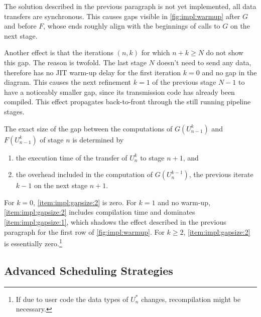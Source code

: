 The solution described in the previous paragraph is not yet implemented,
\ie all data transfers are synchronous.
This causes gaps visible in \autoref{fig:impl:warmup} after $G$ and before $F$,
whose ends roughly align with the beginnings of calls to $G$ on the next stage.

Another effect is that the iterations $(n,k)$ for which $n+k \geq N$ do not show this gap.
The reason is twofold.
The last stage $N$ doesn't need to send any data, therefore has no \ac{JIT} warm-up delay for the first iteration $k=0$ and no gap in the diagram.
This causes the next refinement $k=1$ of the previous stage $N-1$ to have a noticeably smaller gap,
since its transmission code has already been compiled.
This effect propagates back-to-front through the still running pipeline stages.

The exact size of the gap between the computations of $G(U_{n-1}^k)$ and $F(U_{n-1}^k)$ of stage $n$ is determined by
\begin{enumerate}
  \item\label{item:impl:gapsize:1}
    the execution time of the transfer of $U_n^k$ to stage $n+1$, and
  \item\label{item:impl:gapsize:2}
    the overhead included in the computation of $G(U_n^{k-1})$,
    \ie the previous iterate $k-1$ on the next stage $n+1$.
\end{enumerate}
For $k=0$, \ref{item:impl:gapsize:2} is zero.
For $k=1$ and no warm-up, \ref{item:impl:gapsize:2} includes compilation time and dominates \ref{item:impl:gapsize:1},
which shadows the effect described in the previous paragraph for the first row of \autoref{fig:impl:warmup}.
For $k\geq 2$, \ref{item:impl:gapsize:2} is essentially zero.\footnote{%
  If due to user code the data types of $U_n^*$ changes, recompilation might be necessary.
}

\subsection{Advanced Scheduling Strategies}

